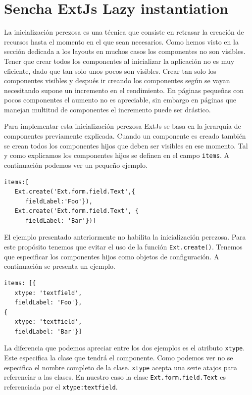 \section{Sencha ExtJs Lazy instantiation}
	La inicialización perezosa es una técnica que consiste en retrasar la creación de recursos hasta el momento en el que sean necesarios. Como
	hemos visto en la sección dedicada a los layouts en muchos casos los componentes no son visibles. Tener que crear todos los componentes al
	inicializar la aplicación no es muy eficiente, dado que tan solo unos pocos son visibles. Crear tan solo los componentes visibles y después ir
	creando los componentes según se vayan necesitando supone un incremento en el rendimiento. En páginas pequeñas con pocos componentes el
	aumento no es apreciable, sin embargo en páginas que manejan multitud de componentes el incremento puede ser drástico. 
	\par
	Para implementar esta inicialización perezosa ExtJs se basa en la jerarquía de componentes previamente explicada. Cuando un componente es
	creado también se crean todos los componentes hijos que deben ser visibles en ese momento. Tal y como explicamos los componentes hijos se
	definen en el campo \texttt{items}. A continuación podemos ver un pequeño ejemplo. 
	\begin{lstlisting}
items:[
   Ext.create('Ext.form.field.Text',{
      fieldLabel:'Foo'}),
   Ext.create('Ext.form.field.Text', {
      fieldLabel: 'Bar'})]
	\end{lstlisting}
	El ejemplo presentado anteriormente no habilita la inicialización perezosa. Para este propósito tenemos que evitar el uso de la función
	\texttt{Ext.create()}. Tenemos que especificar los componentes hijos como objetos de configuración. A continuación se presenta un ejemplo.
	\begin{lstlisting}
items: [{
   xtype: 'textfield',
   fieldLabel: 'Foo'},
{
   xtype: 'textfield',
   fieldLabel: 'Bar'}]
	\end{lstlisting}
	La diferencia que podemos apreciar entre los dos ejemplos es el atributo \texttt{xtype}. Este especifica la clase que tendrá el componente.
	Como podemos ver no se especifica el nombre completo de la clase. \texttt{xtype} acepta una serie atajos para referenciar a las clases. En
	nuestro caso la clase \texttt{Ext.form.field.Text} es referenciada por el \texttt{xtype:\cc textfield\cc}.
